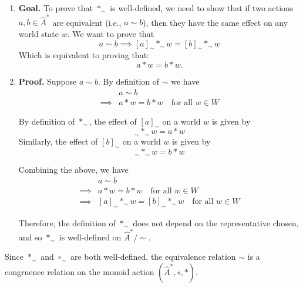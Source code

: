 \begin{proofE}
\begin{enumerate}
    \item \textbf{Goal.}
    To prove that $\ast_{\sim}$ is well-defined, we need to show that if two actions $a, b \in \hat{A}^{\ast}$ are equivalent (i.e., $a \sim b$), then they have the same effect on any world state $w$.
    We want to prove that
    \begin{equation}
        a \sim b \implies [a]_{\sim} \ast_{\sim} w = [b]_{\sim} \ast_{\sim} w
    \end{equation}
    Which is equivalent to proving that:
    \begin{equation}
        a \ast w = b \ast w.
    \end{equation}

    \item \textbf{Proof.}
    Suppose $a \sim b$.
    By definition of $\sim$ we have
    \begin{align}
        & a \sim b \\
        \implies & a \ast w = b \ast w \quad \text{for all } w \in W
    \end{align}

    By definition of $\ast_{\sim}$, the effect of $[a]_{\sim}$ on a world $w$ is given by
    \begin{equation}
      [a]_{\sim} \ast_{\sim} w = a \ast w
    \end{equation}
    Similarly, the effect of $[b]_{\sim}$ on a world $w$ is given by
    \begin{equation}
      [b]_{\sim} \ast_{\sim} w = b \ast w
    \end{equation}

    Combining the above, we have
    \begin{align}
        & a \sim b \\
        \implies & a \ast w = b \ast w \quad \text{for all } w \in W \\
        \implies & [a]_{\sim} \ast_{\sim} w = [b]_{\sim} \ast_{\sim} w \quad \text{for all } w \in W
    \end{align}

    Therefore, the definition of $\ast_{\sim}$ does not depend on the representative chosen, and so $\ast_{\sim}$ is well-defined on $\hat{A}^{\ast}/\sim$.
\end{enumerate}
\end{proofE}

Since $\ast_{\sim}$ and $\circ_{\sim}$ are both well-defined, the equivalence relation $\sim$ is a congruence relation on the monoid action $(\hat{A}^{*}, \circ, \ast)$. 

